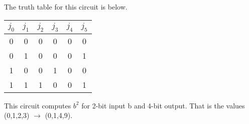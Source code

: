 \documentclass[11pt,fleqn]{article}
\begin{document}
\begin{enumerate}
The truth table for this circuit is below.

\begin{tabular}{ c c | c c c c }

 $ j_{0}$ &$ j_{1}$ & $ j_{2}$ & $ j_{3}$ & $ j_{4}$ & $ j_{5}$\\
\hline
  0 & 0 & 0 & 0 & 0 & 0 \\
  0 & 1 & 0 & 0 & 0 & 1 \\ 
  1 & 0 & 0 & 1 & 0 & 0 \\
  1 & 1 & 1 & 0 & 0 & 1 \\
\end{tabular}

This circuit computes $b^2$ for 2-bit input b and 4-bit output. That is the values (0,1,2,3) $ \rightarrow$ (0,1,4,9).

\end{enumerate}
\end{document}

